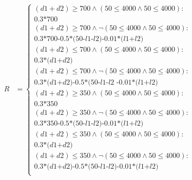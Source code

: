 \documentclass[letterpaper]{article}
\renewcommand{\-}{\text{-}}
\begin{document}
{\footnotesize
\begin{align*}
R & = \begin{cases}
(d1+d2) \geq 700 \wedge (50 \leq 4000 \wedge 50 \leq 4000) :\\
\textit{0.3*700}  \\
(d1+d2) \geq 700 \wedge \neg (50 \leq 4000 \wedge 50 \leq 4000) :\\
\textit{0.3*700-0.5*(50-l1-l2)-0.01*(l1+l2)}  \\
(d1+d2) \leq 700 \wedge (50 \leq 4000 \wedge 50 \leq 4000): \\
\textit{0.3*(d1+d2)} \\
(d1+d2) \leq 700 \wedge \neg (50 \leq 4000 \wedge 50 \leq 4000): \\
\textit{0.3*(d1+d2)-0.5*(50-l1-l2 -0.01*(l1+l2)} \\
(d1+d2) \geq 350 \wedge (50 \leq 4000 \wedge 50 \leq 4000): \\
\textit{0.3*350} \\
(d1+d2) \geq 350 \wedge \neg (50 \leq 4000 \wedge 50 \leq 4000): \\
\textit{0.3*350-0.5*(50-l1-l2)-0.01*(l1+l2)}\\
(d1+d2) \leq 350 \wedge (50 \leq 4000 \wedge 50 \leq 4000): \\
\textit{0.3*(d1+d2)} \\
(d1+d2) \leq 350 \wedge \neg (50 \leq 4000 \wedge 50 \leq 4000): \\
\textit{0.3*(d1+d2)-0.5*(50-l1-l2)-0.01*(l1+l2)}\\
\end{cases}
\end{align*}}
\end{document}
